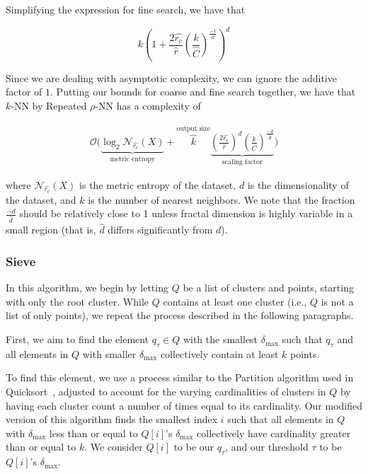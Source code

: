 Simplifying the expression for fine search, we have that

\begin{equation*}
    k\left(1+ \frac{2\hat{r_c}}{\hat{r}}\left(\frac{k}{\hat{C}}\right)^{\frac{-1}{\hat{d}}}\right)^d
\end{equation*}

Since we are dealing with asymptotic complexity, we can ignore the additive factor of $1$.
Putting our bounds for coarse and fine search together, we have that $k$-NN by Repeated $\rho$-NN has a complexity of



\begin{gather}
    \mathcal{O}\Bigg(
    \underbrace{\log_2{\mathcal{N}_{\hat{r_c}}(X)}}_{\textrm{metric entropy}} + 
    \overbrace{k}^{\textrm{output size}}
    \underbrace{\left(\frac{2\hat{r_c}}{\hat{r}}\right)^d\left(\frac{k}{\hat{C}}\right)^{\frac{-d}{\hat{d}}}}_{\textrm{scaling factor}}\Bigg)
    \label{eq:methods:knn-by-rnn-complexity}
\end{gather}

where $\mathcal{N}_{\hat{r_c}}(X)$ is the metric entropy of the dataset, $d$ is the dimensionality of the dataset, and $k$ is the number of nearest neighbors.
We note that the fraction $\frac{-d}{\hat{d}}$ should be relatively close to 1 unless fractal dimension is highly variable in a small region (that is, $\hat{d}$ differs significantly from $d$).


\subsubsection{Sieve}
\label{subsubsec:methods:knn-search:sieve}

In this algorithm, we begin by letting $Q$ be a list of clusters and points, starting with only the root cluster. 
While $Q$ contains at least one cluster (i.e., $Q$ is not a list of only points), we repeat the process described in 
the following paragraphs. 

First, we aim to find the element $q_{\tau} \in Q$ with the smallest $\delta_{\max}$ such that 
$q_{\tau}$ and all elements in $Q$ with smaller $\delta_{\max}$ collectively contain at least $k$ points. 

To find this element, we use a process similar to the Partition algorithm used in Quicksort~\cite{10.1093/comjnl/5.1.10}, adjusted to account for the varying cardinalities of clusters in $Q$ by having each cluster count a number of times equal to its cardinality.
Our modified version of this algorithm finds the smallest index $i$ such that all elements in $Q$ with $\delta_{\max}$ less than or equal to $Q[i]$'s $\delta_{\max}$ collectively have cardinality greater than or equal to $k$.
We consider $Q[i]$ to be our $q_{\tau}$, and our threshold $\tau$ to be $Q[i]$'s $\delta_{\max}$.

